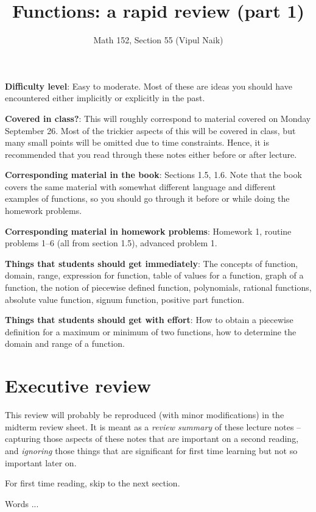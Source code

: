 \documentclass{amsart}
\title{Functions: a rapid review (part 1)}
\author{Math 152, Section 55 (Vipul Naik)}
\begin{document}
\maketitle

{\bf Difficulty level}: Easy to moderate. Most of these are ideas you
should have encountered either implicitly or explicitly in the past.

{\bf Covered in class?}: This will roughly correspond to material
covered on Monday September 26. Most of the trickier aspects of this
will be covered in class, but many small points will be omitted due to
time constraints. Hence, it is recommended that you read through these
notes either before or after lecture.

{\bf Corresponding material in the book}: Sections 1.5, 1.6. Note that
the book covers the same material with somewhat different language and
different examples of functions, so you should go through it before or
while doing the homework problems.

{\bf Corresponding material in homework problems}: Homework 1, routine
problems 1--6 (all from section 1.5), advanced problem 1.
 
{\bf Things that students should get immediately}: The concepts of
function, domain, range, expression for function, table of values for
a function, graph of a function, the notion of piecewise defined
function, polynomials, rational functions, absolute value function,
signum function, positive part function.

{\bf Things that students should get with effort}: How to obtain a
piecewise definition for a maximum or minimum of two functions, how to
determine the domain and range of a function.

\section*{Executive review}

This review will probably be reproduced (with minor modifications) in
the midterm review sheet. It is meant as a {\em review summary} of
these lecture notes -- capturing those aspects of these notes that are
important on a second reading, and {\em ignoring} those things that
are significant for first time learning but not so important later on.

For first time reading, skip to the next section.

Words ...
\end{document}
